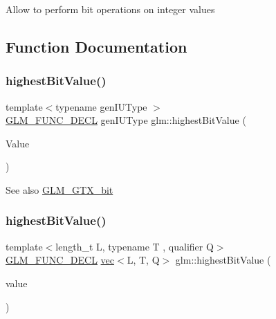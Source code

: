 Allow to perform bit operations on integer values 

\subsection{Function Documentation}
\mbox{\label{group__gtx__bit_ga0dcc8fe7c3d3ad60dea409281efa3d05}} 
\subsubsection{\texorpdfstring{highest\+Bit\+Value()}{highestBitValue()}\hspace{0.1cm}{\footnotesize\ttfamily [1/2]}}
{\footnotesize\ttfamily template$<$typename gen\+I\+U\+Type $>$ \\
\hyperlink{setup_8hpp_ab2d052de21a70539923e9bcbf6e83a51}{G\+L\+M\+\_\+\+F\+U\+N\+C\+\_\+\+D\+E\+CL} gen\+I\+U\+Type glm\+::highest\+Bit\+Value (\begin{DoxyParamCaption}\item[{gen\+I\+U\+Type}]{Value }\end{DoxyParamCaption})}

\begin{DoxySeeAlso}{See also}
\hyperlink{group__gtx__bit}{G\+L\+M\+\_\+\+G\+T\+X\+\_\+bit} 
\end{DoxySeeAlso}
\mbox{\label{group__gtx__bit_ga898ef075ccf809a1e480faab48fe96bf}} 
\subsubsection{\texorpdfstring{highest\+Bit\+Value()}{highestBitValue()}\hspace{0.1cm}{\footnotesize\ttfamily [2/2]}}
{\footnotesize\ttfamily template$<$length\+\_\+t L, typename T , qualifier Q$>$ \\
\hyperlink{setup_8hpp_ab2d052de21a70539923e9bcbf6e83a51}{G\+L\+M\+\_\+\+F\+U\+N\+C\+\_\+\+D\+E\+CL} \hyperlink{structglm_1_1vec}{vec}$<$L, T, Q$>$ glm\+::highest\+Bit\+Value (\begin{DoxyParamCaption}\item[{\hyperlink{structglm_1_1vec}{vec}$<$ L, T, Q $>$ const \&}]{value }\end{DoxyParamCaption})}

